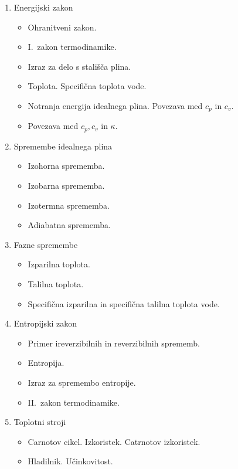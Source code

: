 \begin{enumerate}
    \item Energijski zakon
    \begin{itemize}
        \item Ohranitveni zakon.
        \item I.\ zakon termodinamike.
        \item Izraz za delo s stališča plina.
        \item Toplota. Specifična toplota vode.
        \item Notranja energija idealnega plina. Povezava med \(c_p\) in \(c_v\).
        \item Povezava med \(c_p, c_v\) in \(\kappa\).
    \end{itemize}

    \item Spremembe idealnega plina
    \begin{itemize}
        \item Izohorna sprememba.
        \item Izobarna sprememba.
        \item Izotermna sprememba.
        \item Adiabatna sprememba.
    \end{itemize}

    \item Fazne spremembe
    \begin{itemize}
        \item Izparilna toplota.
        \item Talilna toplota.
        \item Specifična izparilna in specifična talilna toplota vode.
    \end{itemize}

    \item Entropijski zakon
    \begin{itemize}
        \item Primer ireverzibilnih in reverzibilnih sprememb.
        \item Entropija.
        \item Izraz za spremembo entropije.
        \item II.\ zakon termodinamike.
    \end{itemize}

    \item Toplotni stroji
    \begin{itemize}
        \item Carnotov cikel. Izkoristek. Catrnotov izkoristek.
        \item Hladilnik. Učinkovitost.
    \end{itemize}
\end{enumerate}

